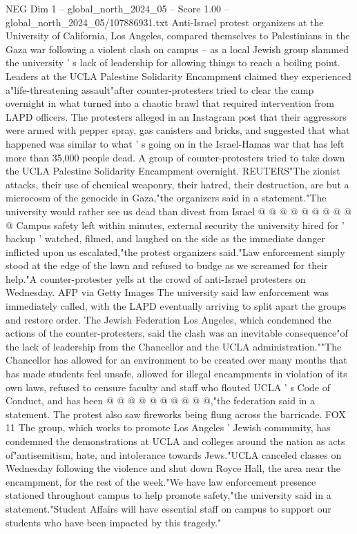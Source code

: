 \begin{textsample}{NEG Dim 1 – global\_north\_2024\_05 – Score 1.00 – global\_north\_2024\_05/107886931.txt}  \label{ex:f1_neg_052}
Anti-Israel protest organizers at the University of California, Los Angeles, compared themselves to Palestinians in the Gaza war following a violent clash on campus -- as a local Jewish group slammed the university ' s lack of leadership for allowing things to reach a boiling point.
Leaders at the UCLA Palestine Solidarity Encampment claimed they experienced a"life-threatening assault"after counter-protesters tried to clear the camp overnight in what turned into a chaotic brawl that required intervention from LAPD officers.
The protesters alleged in an Instagram post that their aggressors were armed with pepper spray, gas canisters and bricks, and suggested that what happened was similar to what ' s going on in the Israel-Hamas war that has left more than 35,000 people dead.
A group of counter-protesters tried to take down the UCLA Palestine Solidarity Encampment overnight.
REUTERS"The zionist attacks, their use of chemical weaponry, their hatred, their destruction, are but a microcosm of the genocide in Gaza,"the organizers said in a statement."The university would rather see us dead than divest from Israel @ @ @ @ @ @ @ @ @ @ Campus safety left within minutes, external security the university hired for ' backup ' watched, filmed, and laughed on the side as the immediate danger inflicted upon us escalated,"the protest organizers said."Law enforcement simply stood at the edge of the lawn and refused to budge as we screamed for their help."A counter-protester yells at the crowd of anti-Israel protesters on Wednesday.
AFP via Getty Images The university said law enforcement was immediately called, with the LAPD eventually arriving to split apart the groups and restore order.
The Jewish Federation Los Angeles, which condemned the actions of the counter-protesters, said the clash was an inevitable consequence"of the lack of leadership from the Chancellor and the UCLA administration.""The Chancellor has allowed for an environment to be created over many months that has made students feel unsafe, allowed for illegal encampments in violation of its own laws, refused to censure faculty and staff who flouted UCLA ' s Code of Conduct, and has been @ @ @ @ @ @ @ @ @ @,"the federation said in a statement.
The protest also saw fireworks being flung across the barricade.
FOX 11 The group, which works to promote Los Angeles ' Jewish community, has condemned the demonstrations at UCLA and colleges around the nation as acts of"antisemitism, hate, and intolerance towards Jews."UCLA canceled classes on Wednesday following the violence and shut down Royce Hall, the area near the encampment, for the rest of the week."We have law enforcement presence stationed throughout campus to help promote safety,"the university said in a statement."Student Affairs will have essential staff on campus to support our students who have been impacted by this tragedy."

\end{textsample}

